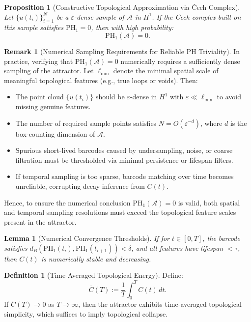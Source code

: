 \documentclass[11pt]{article}
\newtheorem{lemma}[theorem]{Lemma}
\newtheorem{proposition}[theorem]{Proposition}
\theoremstyle{definition}
\newtheorem{definition}[theorem]{Definition}
\newtheorem{remark}[theorem]{Remark}
\begin{document}
\begin{proposition}[Constructive Topological Approximation via \v{C}ech Complex]
Let $\{u(t_i)\}_{i=1}^N$ be a $\varepsilon$-dense sample of $\mathcal{A}$ in $H^1$. If the \v{C}ech complex built on this sample satisfies $\mathrm{PH}_1 = 0$, then with high probability:
\[
\mathrm{PH}_1(\mathcal{A}) = 0.
\]
\end{proposition}

\begin{remark}[Numerical Sampling Requirements for Reliable PH Triviality]
In practice, verifying that $\mathrm{PH}_1(\mathcal{A}) = 0$ numerically requires a sufficiently dense sampling of the attractor. Let $\ell_{\min}$ denote the minimal spatial scale of meaningful topological features (e.g., true loops or voids). Then:

\begin{itemize}
    \item The point cloud $\{u(t_i)\}$ should be $\varepsilon$-dense in $H^1$ with $\varepsilon \ll \ell_{\min}$ to avoid missing genuine features.
    \item The number of required sample points satisfies $N = O(\varepsilon^{-d})$, where $d$ is the box-counting dimension of $\mathcal{A}$.
    \item Spurious short-lived barcodes caused by undersampling, noise, or coarse filtration must be thresholded via minimal persistence or lifespan filters.
    \item If temporal sampling is too sparse, barcode matching over time becomes unreliable, corrupting decay inference from $C(t)$.
\end{itemize}

Hence, to ensure the numerical conclusion $\mathrm{PH}_1(\mathcal{A}) = 0$ is valid, both spatial and temporal sampling resolutions must exceed the topological feature scales present in the attractor.
\end{remark}

\begin{lemma}[Numerical Convergence Thresholds]
If for $t \in [0, T]$, the barcode satisfies $d_B(\mathrm{PH}_1(t_{i}), \mathrm{PH}_1(t_{i+1})) < \delta$, and all features have lifespan $< \tau$, then $C(t)$ is numerically stable and decreasing.
\end{lemma}

\begin{definition}[Time-Averaged Topological Energy]
Define:
\[
\overline{C}(T) := \frac{1}{T} \int_0^T C(t)\,dt.
\]
If $\overline{C}(T) \to 0$ as $T \to \infty$, then the attractor exhibits time-averaged topological simplicity, which suffices to imply topological collapse.
\end{definition}
\end{document}
